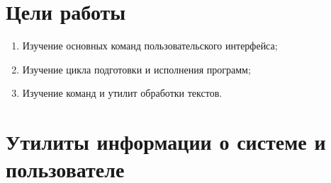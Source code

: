 





\tableofcontents
\newpage

\section{Цели работы}

\begin{enumerate}
	\item Изучение основных команд пользовательского интерфейса;
	\item Изучение цикла подготовки и исполнения программ;
	\item Изучение команд и утилит обработки текстов.
\end{enumerate}

\section{Утилиты информации о системе и пользователе}

\subsection{}

\subsection{}

\subsection{}

\subsection{}

\subsection{}

\subsection{}

\subsection{}

